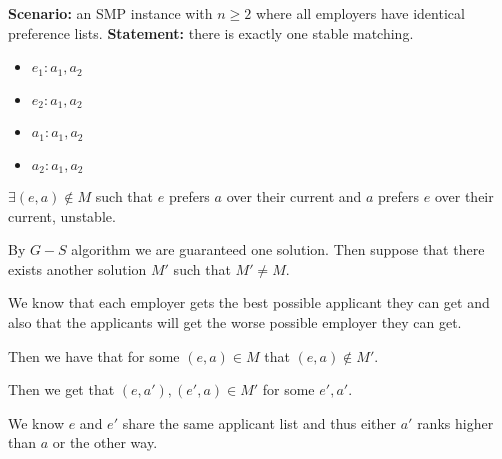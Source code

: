 \begin{questions}
\begin{soln}
	\end{soln}
	\ifsolutions\fi

	\question[4] \textbf{Scenario:} an SMP instance with $n \ge 2$ where all employers have identical preference lists. \textbf{Statement:} there is exactly one stable matching.
	\begin{itemize}
		\item	\(e_1 : a_1, a_2\)
		\item \(e_2 : a_1, a_2\)
		\item \(a_1 : a_1, a_2\)
		\item \(a_2 : a_1, a_2\)
	\end{itemize}

	\ifsolutions\fi

	\(\exists (e, a) \notin M\) such that \(e\) prefers \(a\) over their current and \(a\) prefers \(e\) over their current, unstable.

	\begin{soln}

		By \(G-S\) algorithm we are guaranteed one solution. Then suppose that there exists another solution \(M'\) such that \(M' \neq M\).

		We know that each employer gets the best possible applicant they can get and also that the applicants will get the worse possible employer they can get.

		Then we have that for some \((e, a) \in M\) that \((e, a) \notin M'\).

		Then we get that \((e, a'), (e', a) \in M'\) for some \(e', a'\).

		We know \(e\) and \(e'\) share the same applicant list and thus either \(a'\) ranks higher than \(a\) or the other way.


	\end{soln}

\end{questions}
